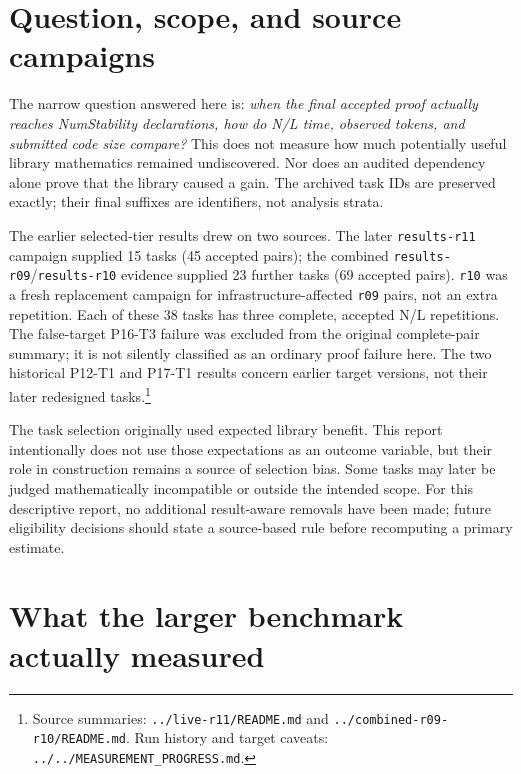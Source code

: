 \documentclass[10pt]{article}
\newcommand{\pathref}[1]{\nolinkurl{#1}}
\begin{document}
\section{Question, scope, and source campaigns}
The narrow question answered here is: \emph{when the final accepted proof actually reaches NumStability declarations, how do N/L time, observed tokens, and submitted code size compare?} This does not measure how much potentially useful library mathematics remained undiscovered. Nor does an audited dependency alone prove that the library caused a gain. The archived task IDs are preserved exactly; their final suffixes are identifiers, not analysis strata.

The earlier selected-tier results drew on two sources. The later \texttt{results-r11} campaign supplied 15 tasks (45 accepted pairs); the combined \texttt{results-r09}/\texttt{results-r10} evidence supplied 23 further tasks (69 accepted pairs). \texttt{r10} was a fresh replacement campaign for infrastructure-affected \texttt{r09} pairs, not an extra repetition. Each of these 38 tasks has three complete, accepted N/L repetitions. The false-target P16-T3 failure was excluded from the original complete-pair summary; it is not silently classified as an ordinary proof failure here. The two historical P12-T1 and P17-T1 results concern earlier target versions, not their later redesigned tasks.\footnote{Source summaries: \pathref{../live-r11/README.md} and \pathref{../combined-r09-r10/README.md}. Run history and target caveats: \pathref{../../MEASUREMENT_PROGRESS.md}.}

The task selection originally used expected library benefit. This report intentionally does not use those expectations as an outcome variable, but their role in construction remains a source of selection bias. Some tasks may later be judged mathematically incompatible or outside the intended scope. For this descriptive report, no additional result-aware removals have been made; future eligibility decisions should state a source-based rule before recomputing a primary estimate.

\section{What the larger benchmark actually measured}
\end{document}
